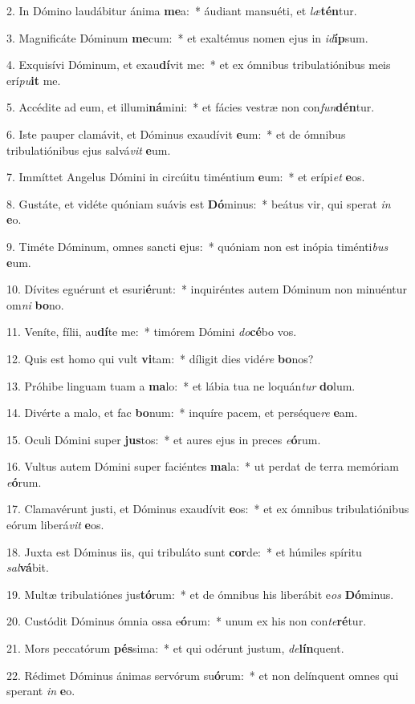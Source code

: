 2. In Dómino laudábitur ánima \textbf{me}a:~*  áudiant mansuéti, et \textit{læ}\textbf{tén}tur.\

3. Magnificáte Dóminum \textbf{me}cum:~*  et exaltémus nomen ejus in \textit{id}\textbf{íp}sum.\

4. Exquisívi Dóminum, et exau\textbf{dí}vit me:~*  et ex ómnibus tribulatiónibus meis erí\textit{pu}\textbf{it} me.\

5. Accédite ad eum, et illumi\textbf{ná}mini:~*  et fácies vestræ non con\textit{fun}\textbf{dén}tur.\

6. Iste pauper clamávit, et Dóminus exaudívit \textbf{e}um:~*  et de ómnibus tribulatiónibus ejus salvá\textit{vit} \textbf{e}um.\

7. Immíttet Angelus Dómini in circúitu timéntium \textbf{e}um:~*  et erípi\textit{et} \textbf{e}os.\

8. Gustáte, et vidéte quóniam suávis est \textbf{Dó}minus:~*  beátus vir, qui sperat \textit{in} \textbf{e}o.\

9. Timéte Dóminum, omnes sancti \textbf{e}jus:~*  quóniam non est inópia timénti\textit{bus} \textbf{e}um.\

10. Dívites eguérunt et esuri\textbf{é}runt:~*  inquiréntes autem Dóminum non minuéntur om\textit{ni} \textbf{bo}no.\

11. Veníte, fílii, au\textbf{dí}te me:~*  timórem Dómini \textit{do}\textbf{cé}bo vos.\

12. Quis est homo qui vult \textbf{vi}tam:~*  díligit dies vidé\textit{re} \textbf{bo}nos?\

13. Próhibe linguam tuam a \textbf{ma}lo:~*  et lábia tua ne loquán\textit{tur} \textbf{do}lum.\

14. Divérte a malo, et fac \textbf{bo}num:~*  inquíre pacem, et perséque\textit{re} \textbf{e}am.\

15. Oculi Dómini super \textbf{jus}tos:~*  et aures ejus in preces \textit{e}\textbf{ó}rum.\

16. Vultus autem Dómini super faciéntes \textbf{ma}la:~*  ut perdat de terra memóriam \textit{e}\textbf{ó}rum.\

17. Clamavérunt justi, et Dóminus exaudívit \textbf{e}os:~*  et ex ómnibus tribulatiónibus eórum liberá\textit{vit} \textbf{e}os.\

18. Juxta est Dóminus iis, qui tribuláto sunt \textbf{cor}de:~*  et húmiles spíritu \textit{sal}\textbf{vá}bit.\

19. Multæ tribulatiónes jus\textbf{tó}rum:~*  et de ómnibus his liberábit e\textit{os} \textbf{Dó}minus.\

20. Custódit Dóminus ómnia ossa e\textbf{ó}rum:~*  unum ex his non con\textit{te}\textbf{ré}tur.\

21. Mors peccatórum \textbf{pés}sima:~*  et qui odérunt justum, \textit{de}\textbf{lín}quent.\

22. Rédimet Dóminus ánimas servórum su\textbf{ó}rum:~*  et non delínquent omnes qui sperant \textit{in} \textbf{e}o.\

